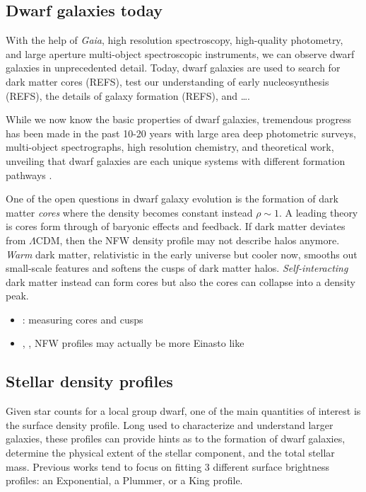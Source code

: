 \subsection{Dwarf galaxies today}\label{dwarf-galaxies-today}

With the help of \emph{Gaia}, high resolution spectroscopy, high-quality
photometry, and large aperture multi-object spectroscopic instruments,
we can observe dwarf galaxies in unprecedented detail. Today, dwarf
galaxies are used to search for dark matter cores (REFS), test our
understanding of early nucleosynthesis (REFS), the details of galaxy
formation (REFS), and \ldots.

While we now know the basic properties of dwarf galaxies, tremendous
progress has been made in the past 10-20 years with large area deep
photometric surveys, multi-object spectrographs, high resolution
chemistry, and theoretical work, unveiling that dwarf galaxies are each
unique systems with different formation pathways
\citep[e.g.][]{simon2019}.

\citet{battaglia+nipoti2022}

One of the open questions in dwarf galaxy evolution is the formation of
dark matter \emph{cores} where the density becomes constant instead
\(\rho \sim 1\). A leading theory is cores form through of baryonic
effects and feedback. If dark matter deviates from \(\Lambda\)CDM, then
the NFW density profile may not describe halos anymore. \emph{Warm} dark
matter, relativistic in the early universe but cooler now, smooths out
small-scale features and softens the cusps of dark matter halos.
\emph{Self-interacting} dark matter instead can form cores but also the
cores can collapse into a density peak.

\begin{itemize}
\tightlist
\item
  \citet{walker+penarrubia2011}: measuring cores and cusps
\item
  \citet{dicintio+2013}, \citet{navarro+2010}, NFW profiles may actually
  be more Einasto like
\end{itemize}

\subsection{Stellar density profiles}\label{stellar-density-profiles}

Given star counts for a local group dwarf, one of the main quantities of
interest is the surface density profile. Long used to characterize and
understand larger galaxies, these profiles can provide hints as to the
formation of dwarf galaxies, determine the physical extent of the
stellar component, and the total stellar mass. Previous works tend to
focus on fitting 3 different surface brightness profiles: an
Exponential, a Plummer, or a King profile.

